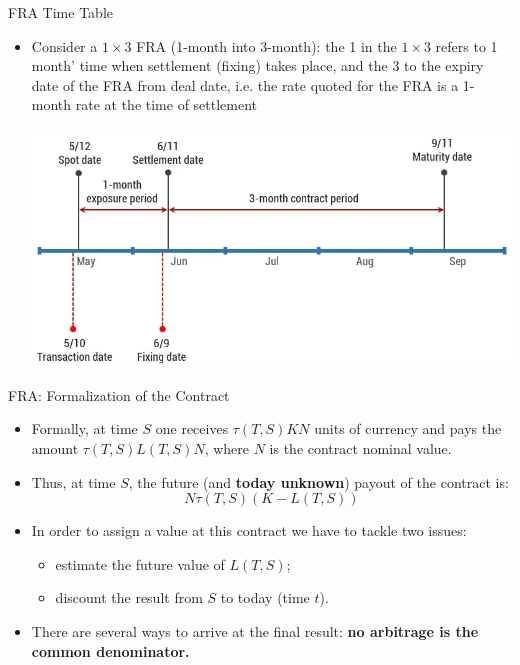\documentclass{beamer}
\begin{document}
\begin{frame}{FRA Time Table}
	\begin{itemize}
		\item Consider a $1\times 3$ FRA (1-month into 3-month): the 1 in the $1\times 3$ refers to 1 month' time when settlement (fixing) takes place, and the 3 to the expiry date of the FRA from deal date, i.e. the rate quoted for the FRA is a 1-month rate at the time of settlement
	\begin{center}
		\includegraphics[width=0.8\linewidth]{fra_timeline}
	\end{center}
\end{itemize}
\end{frame}

\begin{frame}{FRA: Formalization of the Contract}
	\begin{itemize}
		\item<1-> Formally, at time $S$ one receives $\tau(T, S)KN$ units of currency and pays the amount $\tau(T,S)L(T,S)N$, where $N$ is the contract nominal value.
		\item<2-> Thus, at time $S$, the future (and \textbf{today unknown}) payout of the contract is: 
		\begin{equation}
			N\tau(T,S)(K-L(T,S))
			\label{eq:fra_payoff}
		\end{equation}
		\item<3-> In order to assign a value at this contract we have to tackle two issues:
		\begin{itemize}
			\item<3-> estimate the future value of $L(T, S)$;
			\item<3-> discount the result from $S$ to today (time $t$).
		\end{itemize}
		\item<4-> There are several ways to arrive at the final result: \textbf{no arbitrage is the common denominator.}
	\end{itemize}
\end{frame}
\end{document}
